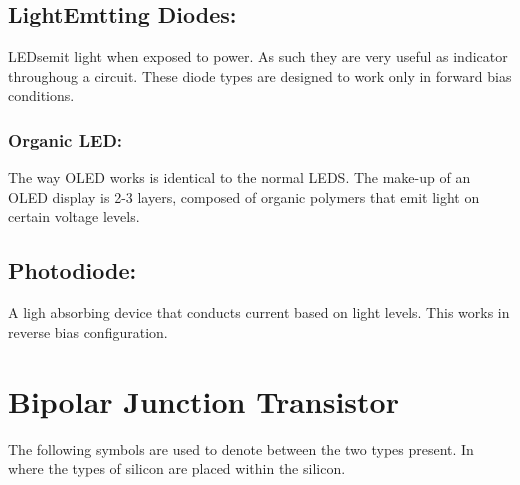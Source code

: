 \documentclass[a5paper]{article}
\begin{document}
	\subsection{LightEmtting Diodes:}
	LEDsemit light when exposed to power. As such they are very useful as indicator throughoug a circuit. These diode types are designed to work only in forward bias conditions.
	\begin{center}
	\end{center}
	\subsubsection{Organic LED:}
	The way OLED works is identical to the normal LEDS. The make-up of an OLED display is 2-3 layers, composed of organic polymers that emit light on certain voltage levels.
	\subsection{Photodiode:}
	A ligh absorbing device that conducts current based on light levels. This works in reverse bias configuration.
	\begin{center}
	\end{center}

	\section{Bipolar Junction Transistor}
	The following symbols are used to denote between the two types present. In where the types of silicon are placed within the silicon.
	\begin{center}
	\end{center}
\end{document}
